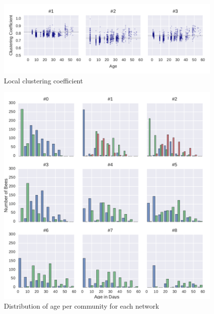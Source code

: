 \begin{figure}[htb]
	\centering
	\includegraphics[width=1.0\textwidth]{Figures/stat-ccAge}
	\caption[Local clustering coefficient]{Local clustering coefficient}
	\label{fig:ccAge}
\end{figure}

\begin{figure}[htb]
	\centering
	\includegraphics[width=1.0\textwidth]{Figures/ageDistribution}
	\caption{Distribution of age per community for each network}
	\label{fig:ageDist}
\end{figure}
